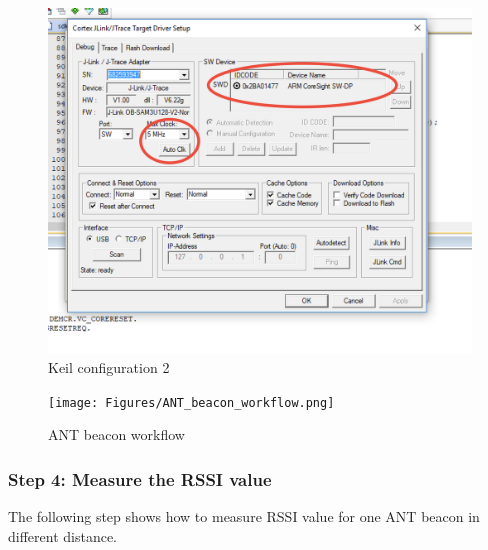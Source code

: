 \documentclass{article}
\begin{document}
\begin{figure}[!h]
\begin{center}
\caption{Keil configuration 2}
\label{Keil_configuration_2}
\includegraphics[width=0.5\columnwidth]{Figures/Keil_config_2.png}
\end{center}
\end{figure}

\begin{figure}[!h]
\begin{center}
\caption{ANT beacon workflow}
\label{ANT_beacon_workflow}
\texttt{[image: Figures/ANT\_beacon\_workflow.png]}
\end{center}
\end{figure}

\subsubsection{Step 4: Measure the RSSI value}
The following step shows how to measure RSSI value for one ANT beacon in different distance. \\
\end{document}
